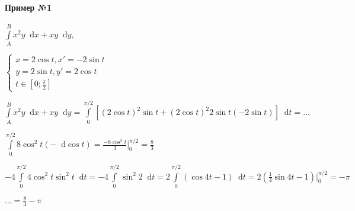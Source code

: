 \documentclass{article}
\newcommand*\diff{\mathop{}\!\mathrm{d}}
\begin{document}
\paragraph{Пример №1} $\int\limits_{A}^{B} x^2 y \diff x + x y \diff y$,

$\begin{cases}
    x = 2 \cos t, x' = -2 \sin t \\ 
    y = 2 \sin t, y' = 2 \cos t \\ 
    t \in [0; \frac{\pi}{2}]
\end{cases}
$

$\int\limits_{A}^{B} x^2 y \diff x + x y \diff y = \int\limits_{0}^{\pi/2} [(2 \cos t)^2 \sin t + (2 \cos t)^2 2 \sin t (-2 \sin t)] \diff t = \dots$

$\int\limits_{0}^{\pi/2} 8 \cos^2 t (-\diff \cos t) = \frac{-8 \cos^3 t}{3} \bigg|_{0}^{\pi/2} = \frac{8}{3}$

$- 4 \int\limits_{0}^{\pi/2} 4 \cos^2 t \sin^2 t \diff t = -4 \int\limits_{0}^{\pi/2} \sin^2 2 \diff t = 2 \int\limits_{0}^{\pi/2} (\cos 4t - 1) \diff t = 2 (\frac{1}{4} \sin 4 t - 1) \bigg|_{0}^{\pi/2} = -\pi$

$\dots = \frac{8}{3} - \pi$
\end{document}
